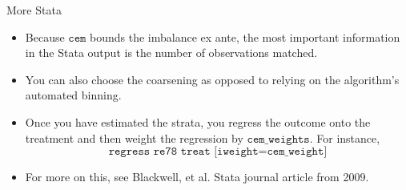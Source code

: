\documentclass{beamer}
\begin{document}
\begin{frame}{More Stata}
	
	\begin{itemize}
	\item Because $\texttt{cem}$ bounds the imbalance ex ante, the most important information in the Stata output is the number of observations matched.
	\item You can also choose the coarsening as opposed to relying on the algorithm's automated binning.  
	\item Once you have estimated the strata, you regress the outcome onto the treatment and then weight the regression by $\texttt{cem_weights}$.  For instance, $$\texttt{regress re78 treat [iweight=cem\_weight]}$$
	\item For more on this, see Blackwell, et al. Stata journal article from 2009.  
	\end{itemize}
\end{frame}
\end{document}
